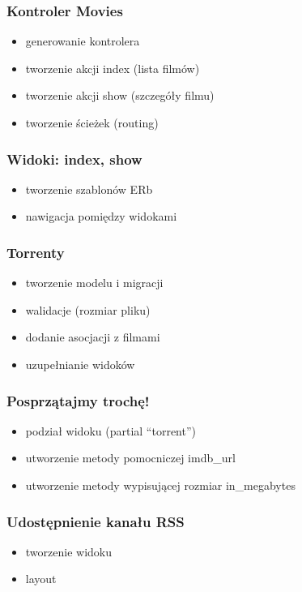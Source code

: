 \documentclass[12t]{beamer}
\begin{document}
\begin{frame}
  \frametitle{Kontroler Movies}
  \begin{itemize}
  \item generowanie kontrolera
  \item tworzenie akcji index (lista filmów)
  \item tworzenie akcji show (szczegóły filmu)
  \item tworzenie ścieżek (routing)
  \end{itemize}
\end{frame}

\begin{frame}
  \frametitle{Widoki: index, show}
  \begin{itemize}
  \item tworzenie szablonów ERb
  \item nawigacja pomiędzy widokami
  \end{itemize}
\end{frame}

\begin{frame}
  \frametitle{Torrenty}
  \begin{itemize}
  \item tworzenie modelu i migracji
  \item walidacje (rozmiar pliku)
  \item dodanie asocjacji z filmami
  \item uzupełnianie widoków
  \end{itemize}
\end{frame}

\begin{frame}
  \frametitle{Posprzątajmy trochę!}
  \begin{itemize}
  \item podział widoku (partial ``torrent'')
  \item utworzenie metody pomocniczej imdb\_url
  \item utworzenie metody wypisującej rozmiar in\_megabytes
  \end{itemize}
\end{frame}

\begin{frame}
  \frametitle{Udostępnienie kanału RSS}
  \begin{itemize}
  \item tworzenie widoku
  \item layout
  \end{itemize}
\end{frame}
\end{document}
